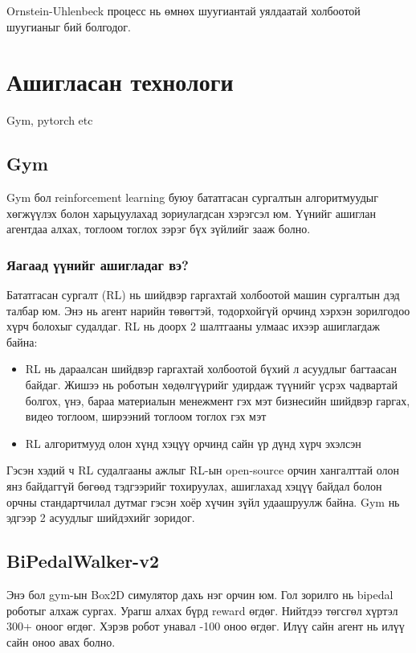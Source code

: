 \documentclass[12pt,A4]{report}
\begin{document}
Ornstein-Uhlenbeck процесс нь өмнөх шуугиантай уялдаатай холбоотой шуугианыг бий болгодог.
 
\section{Ашигласан технологи}

Gym, pytorch etc

\subsection{Gym}

Gym бол reinforcement learning буюу бататгасан сургалтын алгоритмуудыг хөгжүүлэх болон харьцуулахад зориулагдсан хэрэгсэл юм. Үүнийг ашиглан агентдаа алхах, тоглоом тоглох зэрэг бүх зүйлийг зааж болно. 

\subsubsection{Яагаад үүнийг ашигладаг вэ?}

Бататгасан сургалт (RL) нь шийдвэр гаргахтай холбоотой машин сургалтын дэд талбар юм. Энэ нь агент нарийн төвөгтэй, тодорхойгүй орчинд хэрхэн зорилгодоо хүрч болохыг судалдаг. RL нь доорх 2 шалтгааны улмаас ихээр ашиглагдаж байна:

\begin{itemize}
	\item RL нь дараалсан шийдвэр гаргахтай холбоотой бүхий л асуудлыг багтаасан байдаг. Жишээ нь роботын хөдөлгүүрийг удирдаж түүнийг үсрэх чадвартай болгох, үнэ, бараа материалын менежмент гэх мэт бизнесийн шийдвэр гаргах, видео тоглоом, ширээний тоглоом тоглох гэх мэт
	\item RL алгоритмууд олон хүнд хэцүү орчинд сайн үр дүнд хүрч эхэлсэн
\end{itemize} 

Гэсэн хэдий ч RL судалгааны ажлыг RL-ын open-source орчин хангалттай олон янз байдаггүй бөгөөд тэдгээрийг тохируулах, ашиглахад хэцүү байдал болон орчны стандартчилал дутмаг гэсэн хоёр хүчин зүйл удаашруулж байна. Gym нь эдгээр 2 асуудлыг шийдэхийг зоридог.

\subsection{BiPedalWalker-v2}

Энэ бол gym-ын Box2D симулятор дахь нэг орчин юм. Гол зорилго нь bipedal роботыг алхаж сургах. Урагш алхах бүрд reward өгдөг. Нийтдээ төгсгөл хүртэл 300+ оноог өгдөг. Хэрэв робот унавал -100 оноо өгдөг. Илүү сайн агент нь илүү сайн оноо авах болно. 
\end{document}
